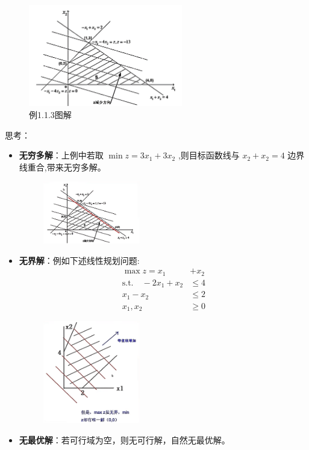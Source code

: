     \begin{figure}[H]
        \centering
        \includegraphics[width=0.6\textwidth]{1.png}
        \caption{例1.1.3图解}
        \label{fig:Chapter2_Temporary_Pavilion_1}
    \end{figure}
    思考：
    \begin{itemize}
        \item \textbf{无穷多解}：上例中若取 $\min z = 3x_1 + 3x_2$ ,则目标函数线与 $x_2 + x_2 = 4$ 边界线重合,带来无穷多解。
        \begin{figure}[H]
            \centering
            \includegraphics[width=0.4\textwidth]{2.png}
            \label{fig:Chapter2_Temporary_Pavilion_2}
        \end{figure}
        \item \textbf{无界解}：例如下述线性规划问题:
        \begin{align*}
        \max z = x_1 &+ x_2 \\
        \text{s.t.} \quad  -2x_1 + x_2 & \leq 4 \\
         x_1 - x_2 & \leq 2 \\
         x_1, x_2 & \geq 0
        \end{align*}
        \begin{figure}[H]
            \centering
            \includegraphics[width=0.4\textwidth]{3.png}
            \label{fig:Chapter2_Temporary_Pavilion_3}
        \end{figure}
        \item \textbf{无最优解}：若可行域为空，则无可行解，自然无最优解。
    \end{itemize}



